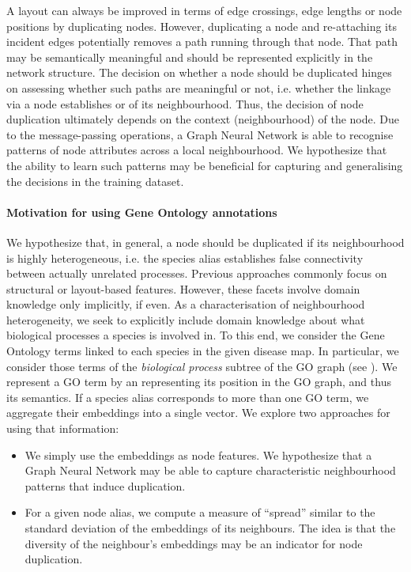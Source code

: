 \documentclass[
	fontsize=10pt, %
	twoside=false, %
	secnumdepth=1, %
  toc=indentunnumbered %
]{kaobook}
\begin{document}
A layout can always be improved in terms of edge crossings, edge lengths or node
positions by duplicating nodes. However, duplicating a node and re-attaching its
incident edges potentially removes a path running through that node. That path
may be semantically meaningful and should be represented explicitly in the
network structure. The decision on whether a node should be duplicated hinges on
assessing whether such paths are meaningful or not, i.e. whether the linkage via
a node establishes  or  of its neighbourhood.
Thus, the decision of node duplication ultimately depends on the context
(neighbourhood) of the node.
%
Due to the message-passing operations, a Graph Neural
Network is able to recognise patterns of node attributes across a local
neighbourhood. We hypothesize that the ability to learn such patterns may be
beneficial for capturing and generalising the decisions in the training dataset.



\paragraph{Motivation for using Gene Ontology annotations}
We hypothesize that, in general, a node should be duplicated if its
neighbourhood is highly heterogeneous, i.e. the species alias establishes false
connectivity between actually unrelated processes.
Previous approaches commonly focus on structural or layout-based features.
However, these facets involve domain knowledge only implicitly, if even.
As a characterisation of neighbourhood heterogeneity, we seek
to explicitly include domain knowledge about what biological processes a species
is involved in. To this end, we consider the Gene Ontology terms linked to each
species in the given disease map. In particular, we consider those terms of the
\textit{biological process} subtree of the GO graph (see ).
%
We represent a GO term by an  representing its position in
the GO graph, and thus its semantics. If a species alias corresponds to more
than one GO term, we aggregate their embeddings into a single vector. We explore
two approaches for using that information:
\begin{itemize}
\item We simply use the embeddings as node features. We hypothesize that a Graph
  Neural Network may be able to capture characteristic neighbourhood patterns
  that induce duplication.
\item For a given node alias, we compute a measure of ``spread'' similar to the
  standard deviation of the embeddings of its neighbours. The idea is that
  the diversity of the neighbour's embeddings may be an indicator for node duplication.
\end{itemize}
\end{document}

